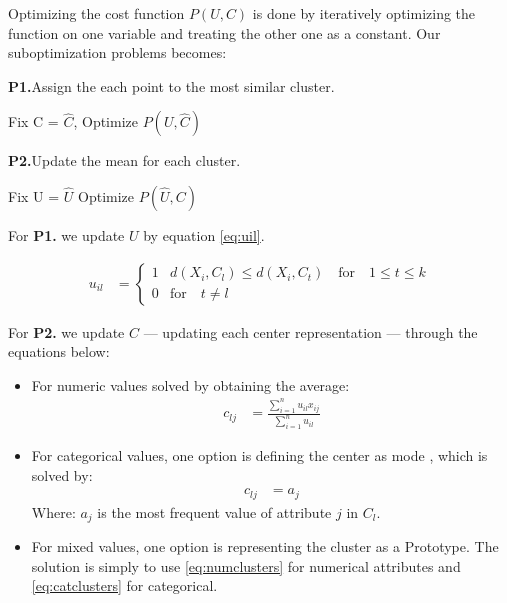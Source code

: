 \documentclass[../report.tex]{subfiles}
\begin{document}
Optimizing the cost function $P(U,C)$ is done by iteratively optimizing the function on one variable and treating the other one as a constant. Our suboptimization problems becomes:

\begin{description}
  \item \textbf{P1.}\quad Assign the each point to the most similar cluster. 
    \begin{description}
    	\item Fix C = $\hat{C}$, Optimize $P(U, \hat{ C })$
    \end{description}

  \item \textbf{P2.}\quad Update the mean for each cluster.
    \begin{description}
		\item Fix U = $\hat{U}$ Optimize $P(\hat{ U },C)$
    \end{description}
\end{description}

For \textbf{P1.} we update $U$ by equation \ref{eq:uil}.

\begin{align}
 \label{eq:uil}
  u_{il} &= 
  \begin{cases}
  1 & d(X_i,C_l) \leq d(X_i,C_t) \quad \text{for} \quad 1 \leq t \leq k \\
  0 & \text{for} \quad t \neq l
  \end{cases}
\end{align}

For \textbf{P2.} we update $C$ --- updating each center representation --- through the equations below:

\begin{itemize}
    \item For numeric values solved by obtaining the average:
      \begin{align}
        \label{eq:numclusters}
        c_{lj} &= \frac{ \sum_{i = 1}^{n}{ u_{ il }x_{ ij }  }}{\sum_{i = 1}^{n}{ u_{ il }}}
      \end{align}
    \item For categorical values, one option is defining the center as mode \cite{Ng1999}, which is solved by:
      \begin{align}
        \label{eq:catclusters}
      c_{lj} &= a_{j}
      \end{align}
      Where: $a_{j}$ is the most frequent value of attribute $j$ in $C_l$.
    \item For mixed values, one option is representing the cluster as a Prototype\cite{Huang97clusteringlarge,Huang1998}. The solution is simply to use \ref{eq:numclusters} for numerical attributes and \ref{eq:catclusters} for categorical.
\end{itemize}
\end{document}
